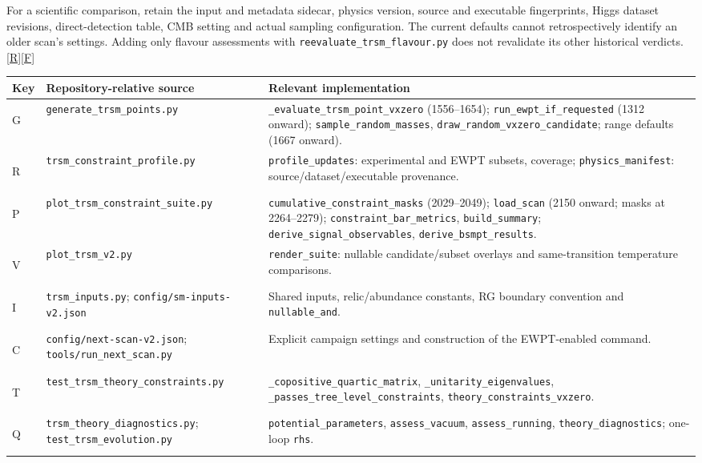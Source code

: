 \documentclass[11pt,a4paper]{article}
\newcommand{\code}[1]{\ifmmode\mbox{\ttfamily\detokenize{#1}}\else\nolinkurl{#1}\fi}
\newcommand{\src}[1]{\hyperlink{src:#1}{\textsf{[#1]}}}
\begin{document}
For a scientific comparison, retain the input and metadata sidecar, physics
version, source and executable fingerprints, Higgs dataset revisions,
direct-detection table, CMB setting and actual sampling configuration.
The current defaults cannot retrospectively identify an older scan's
settings. Adding only flavour assessments with
\code{reevaluate_trsm_flavour.py} does not revalidate its other historical
verdicts. \src{R}\src{F}

\small
\begin{longtable}{@{}p{}p{}p{}@{}}
\toprule
Key & Repository-relative source & Relevant implementation\\
\midrule\endhead
\hypertarget{src:G}{G} & \code{generate_trsm_points.py} &
\code{_evaluate_trsm_point_vxzero} (1556--1654);
\code{run_ewpt_if_requested} (1312 onward);
\code{sample_random_masses}, \code{draw_random_vxzero_candidate};
range defaults (1667 onward).\\
\hypertarget{src:R}{R} & \code{trsm_constraint_profile.py} &
\code{profile_updates}: experimental and EWPT subsets, coverage;
\code{physics_manifest}: source/dataset/executable provenance.\\
\hypertarget{src:P}{P} & \code{plot_trsm_constraint_suite.py} &
\code{cumulative_constraint_masks} (2029--2049);
\code{load_scan} (2150 onward; masks at 2264--2279);
\code{constraint_bar_metrics}, \code{build_summary};
\code{derive_signal_observables}, \code{derive_bsmpt_results}.\\
\hypertarget{src:V}{V} & \code{plot_trsm_v2.py} &
\code{render_suite}: nullable candidate/subset overlays and
same-transition temperature comparisons.\\
\hypertarget{src:I}{I} & \code{trsm_inputs.py}; \code{config/sm-inputs-v2.json} &
Shared inputs, relic/abundance constants, RG boundary convention and
\code{nullable_and}.\\
\hypertarget{src:C}{C} & \code{config/next-scan-v2.json}; \code{tools/run_next_scan.py} &
Explicit campaign settings and construction of the EWPT-enabled command.\\
\hypertarget{src:T}{T} & \code{test_trsm_theory_constraints.py} &
\code{_copositive_quartic_matrix}, \code{_unitarity_eigenvalues},
\code{_passes_tree_level_constraints}, \code{theory_constraints_vxzero}.\\
\hypertarget{src:Q}{Q} & \code{trsm_theory_diagnostics.py}; \code{test_trsm_evolution.py} &
\code{potential_parameters}, \code{assess_vacuum},
\code{assess_running}, \code{theory_diagnostics}; one-loop \code{rhs}.\\

\end{longtable}
\end{document}
